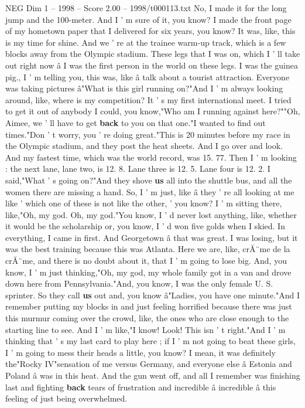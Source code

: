 \begin{textsample}{NEG Dim 1 – 1998 – Score 2.00 – 1998/t000113.txt}
No, I made it for the long jump and the 100-meter.
And I ' m sure of it, you know?
I made the front page of my hometown paper that I delivered for six years, you know?
It was, like, this is my time for shine.
And we ' re at the trainee warm-up track, which is a few blocks away from the Olympic stadium.
These legs that I was on, which I ' ll take out right now â I was the first person in the world on these legs.
I was the guinea pig., I ' m telling you, this was, like â talk about a tourist attraction.
Everyone was taking pictures â"What is this girl running on?"And I ' m always looking around, like, where is my competition?
It ' s my first international meet.
I tried to get it out of anybody I could, you know,"Who am I running against here?""Oh, Aimee, we ' ll have to get \textbf{back} to you on that one."I wanted to find out times."Don ' t worry, you ' re doing great."This is 20 minutes before my race in the Olympic stadium, and they post the heat sheets.
And I go over and look.
And my fastest time, which was the world record, was 15. 77.
Then I ' m looking : the next lane, lane two, is 12. 8.
Lane three is 12. 5.
Lane four is 12. 2.
I said,"What ' s going on?"And they shove \textbf{us} all into the shuttle bus, and all the women there are missing a hand.
So, I ' m just, like â they ' re all looking at me like ' which one of these is not like the other, ' you know?
I ' m sitting there, like,"Oh, my god.
Oh, my god."You know, I ' d never lost anything, like, whether it would be the scholarship or, you know, I ' d won five golds when I skied.
In everything, I came in first.
And Georgetown â that was great.
I was losing, but it was the best training because this was Atlanta.
Here we are, like, crĂ¨me de la crĂ¨me, and there is no doubt about it, that I ' m going to lose big.
And, you know, I ' m just thinking,"Oh, my god, my whole family got in a van and drove down here from Pennsylvania."And, you know, I was the only female U.
S. sprinter.
So they call \textbf{us} out and, you know â"Ladies, you have one minute."And I remember putting my blocks in and just feeling horrified because there was just this murmur coming over the crowd, like, the ones who are close enough to the starting line to see.
And I ' m like,"I know!
Look!
This isn ' t right."And I ' m thinking that ' s my last card to play here ; if I ' m not going to beat these girls, I ' m going to mess their heads a little, you know?
I mean, it was definitely the"Rocky IV"sensation of me versus Germany, and everyone else â Estonia and Poland â was in this heat.
And the gun went off, and all I remember was finishing last and fighting \textbf{back} tears of frustration and incredible â incredible â this feeling of just being overwhelmed.

\end{textsample}
